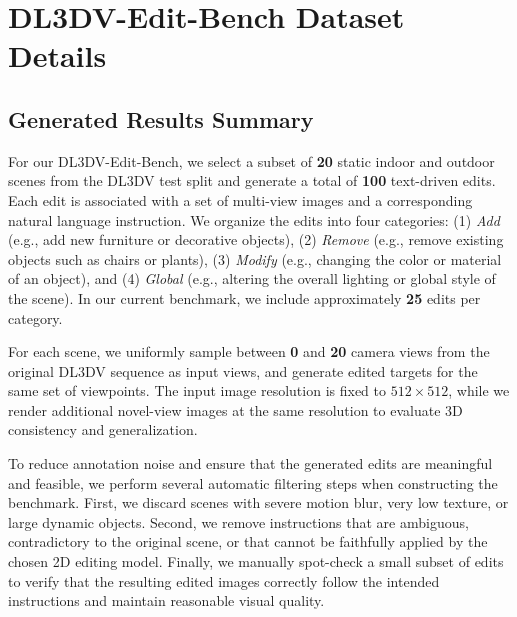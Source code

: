 \section{DL3DV-Edit-Bench Dataset Details}
\label{sec:DL3DV-edit-bench}

\subsection{Generated Results Summary}
For our DL3DV-Edit-Bench, we select a subset of \textbf{20} static indoor and outdoor scenes from the DL3DV test split and generate a total of \textbf{100} text-driven edits. Each edit is associated with a set of multi-view images and a corresponding natural language instruction. We organize the edits into four categories: (1) \emph{Add} (e.g., add new furniture or decorative objects), (2) \emph{Remove} (e.g., remove existing objects such as chairs or plants), (3) \emph{Modify} (e.g., changing the color or material of an object), and (4) \emph{Global} (e.g., altering the overall lighting or global style of the scene). In our current benchmark, we include approximately \textbf{25} edits per category.

For each scene, we uniformly sample between \textbf{0} and \textbf{20} camera views from the original DL3DV sequence as input views, and generate edited targets for the same set of viewpoints. The input image resolution is fixed to $512\times512$, while we render additional novel-view images at the same resolution to evaluate 3D consistency and generalization.

To reduce annotation noise and ensure that the generated edits are meaningful and feasible, we perform several automatic filtering steps when constructing the benchmark. First, we discard scenes with severe motion blur, very low texture, or large dynamic objects. Second, we remove instructions that are ambiguous, contradictory to the original scene, or that cannot be faithfully applied by the chosen 2D editing model. Finally, we manually spot-check a small subset of edits to verify that the resulting edited images correctly follow the intended instructions and maintain reasonable visual quality.

